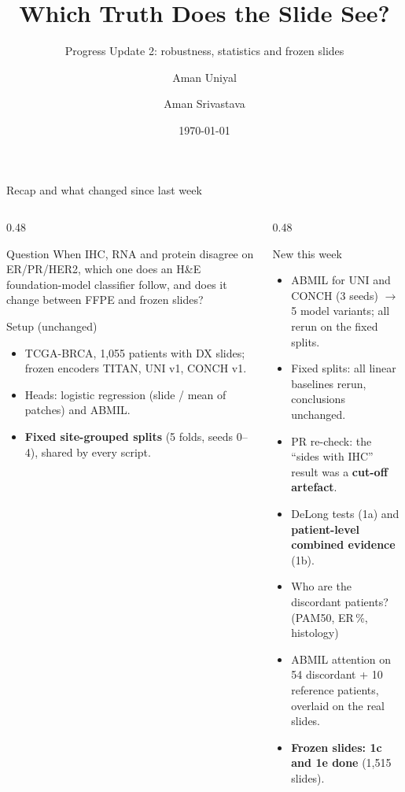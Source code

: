 \documentclass[aspectratio=169,10pt]{beamer}
\title{Which Truth Does the Slide See?}
\subtitle{Progress Update 2: robustness, statistics and frozen slides}
\author{Aman Uniyal \and Aman Srivastava}
\institute{Topics in AI for Healthcare, IIIT Hyderabad}
\date{\today}
\begin{document}
\begin{frame}
  \titlepage
\end{frame}

\begin{frame}[t]{Recap and what changed since last week}
\footnotesize
\begin{columns}[T]
\begin{column}{0.48\textwidth}
\begin{alertblock}{Question}
When IHC, RNA and protein disagree on ER/PR/HER2, which one does an H\&E foundation-model classifier follow,
and does it change between FFPE and frozen slides?
\end{alertblock}
\begin{block}{Setup (unchanged)}
\begin{itemize}
  \item TCGA-BRCA, 1,055 patients with DX slides; frozen encoders TITAN, UNI v1, CONCH v1.
  \item Heads: logistic regression (slide / mean of patches) and ABMIL.
  \item \textbf{Fixed site-grouped splits} (5 folds, seeds 0--4), shared by every script.
\end{itemize}
\end{block}
\end{column}
\begin{column}{0.48\textwidth}
\begin{block}{New this week}
\begin{itemize}
  \item ABMIL for UNI and CONCH (3 seeds) $\rightarrow$ 5 model variants; all rerun on the fixed splits.
  \item Fixed splits: all linear baselines rerun, conclusions unchanged.
  \item PR re-check: the ``sides with IHC'' result was a \textbf{cut-off artefact}.
  \item DeLong tests (1a) and \textbf{patient-level combined evidence} (1b).
  \item Who are the discordant patients? (PAM50, ER\,\%, histology)
  \item ABMIL attention on 54 discordant + 10 reference patients, overlaid on the real slides.
  \item \textbf{Frozen slides: 1c and 1e done} (1,515 slides).
\end{itemize}
\end{block}
\end{column}
\end{columns}
\end{frame}
\end{document}

